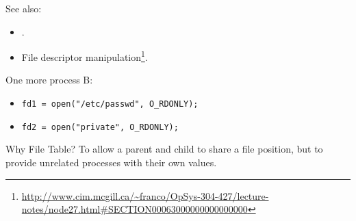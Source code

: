 See also:
\begin{itemize}
\item {}.
\item File descriptor
  manipulation\footnote{\url{http://www.cim.mcgill.ca/~franco/OpSys-304-427/lecture-notes/node27.html\#SECTION00063000000000000000}}.
\end{itemize}

\begin{frame}
  \begin{block}{One more process B:}
    \begin{itemize}
    \item[] \texttt{fd1 = open("/etc/passwd", O\_RDONLY);}
    \item[] \texttt{fd2 = open("private", O\_RDONLY);}
    \end{itemize}
  \end{block}
  \begin{center}
  \end{center}
\end{frame}

\begin{frame}{Why File Table?}
  To allow a parent and child to share a file position, but to provide unrelated processes
  with their own values.
  \label{fig:filetable}
  \begin{center}
  \end{center}
\end{frame}

